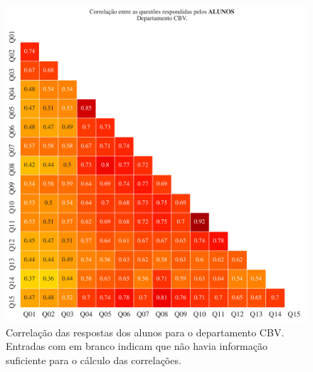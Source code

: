 \documentclass[a4paper,10pt]{article}
\begin{document}
\begin{figure}[h]
\centering
\includegraphics[width=0.999\linewidth]{matriz_corr__CBV_alunos.png}
\caption{\label{fig:corr_alunos}Correlação das respostas dos alunos para o departamento CBV. Entradas com em branco indicam que não havia informação suficiente para o cálculo das correlações.}
\end{figure}
\end{document}
